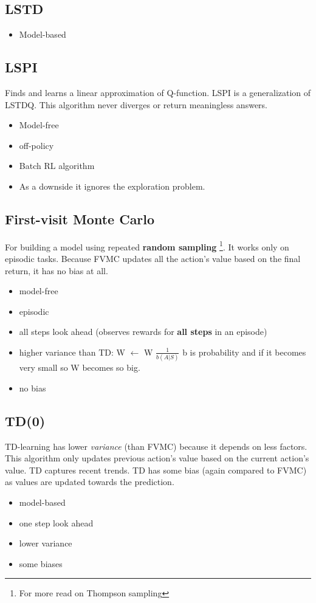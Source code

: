 \documentclass[a4paper,12pt]{article}
\begin{document}
\subsection{LSTD}
\begin{itemize}
    \item Model-based \cite{Boyan1998}
\end{itemize}

\subsection{LSPI}
Finds and learns a linear approximation of Q-function. LSPI is a generalization of LSTDQ. This algorithm never diverges or return meaningless answers.

\begin{itemize}
    \item Model-free \cite{Lagoudakis2003}
    \item off-policy
    \item Batch RL algorithm
    \item As a downside it ignores the exploration problem.
\end{itemize}

\subsection{First-visit Monte Carlo}
For building a model using repeated \textbf{random sampling} \footnote{For more read on Thompson sampling}. It works only on episodic tasks. Because FVMC updates all the action's value based on the final return, it has no bias at all.
\begin{itemize}
    \item model-free
    \item episodic
    \item  all steps look ahead (observes rewards for \textbf{all steps} in an episode)
    \item higher variance than TD: W $\leftarrow$ W $\frac{1}{b(A|S)}$ b is probability and if it becomes very small so W becomes so big.
    \item no bias
\end{itemize}

\subsection{TD(0)}
TD-learning has lower \textit{variance} (than FVMC) because it depends on less factors. This algorithm only updates previous action's value based on the current action's value. TD captures recent trends. TD has some bias (again compared to FVMC) as values are updated towards the prediction.
\begin{itemize}
    \item model-based
    \item one step look ahead
    \item lower variance
    \item some biases
\end{itemize}
\end{document}
